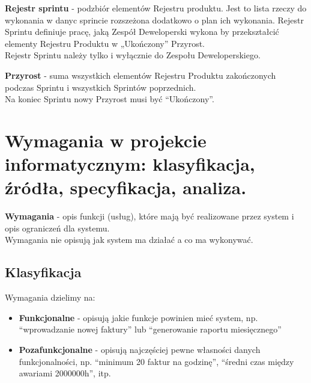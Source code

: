 \documentclass[12pt]{article}
\begin{document}
    \begin{definition}
        \textbf{Rejestr sprintu} - podzbiór elementów Rejestru produktu. Jest to lista rzeczy do wykonania w danyc sprincie rozszeżona dodatkowo o plan ich wykonania.
        Rejestr Sprintu definiuje pracę, jaką Zespół Deweloperski wykona by przekształcić elementy Rejestru Produktu w „Ukończony” Przyrost. \\
        Rejestr Sprintu należy tylko i wyłącznie do Zespołu Deweloperskiego.
    \end{definition}

    \begin{definition}
        \textbf{Przyrost} - suma wszystkich elementów Rejestru Produktu zakończonych podczas Sprintu i wszystkich Sprintów poprzednich. \\
        Na koniec Sprintu nowy Przyrost musi być ``Ukończony''.
    \end{definition}

    \newpage




    \section{Wymagania w projekcie informatycznym: klasyfikacja, źródła, specyfikacja, analiza.}

    \begin{definition}
        \textbf{Wymagania} - opis funkcji (usług), które mają być realizowane przez system i opis ograniczeń dla systemu. \\
        Wymagania nie opisują jak system ma działać a co ma wykonywać.
    \end{definition}

    \subsection{Klasyfikacja}

    \begin{definition}
        Wymagania dzielimy na:
        \begin{itemize}
            \item \textbf{Funkcjonalne} - opisują jakie funkcje powinien mieć system, np. ``wprowadzanie nowej faktury'' lub ``generowanie raportu miesięcznego''
            \item \textbf{Pozafunkcjonalne} - opisują najczęściej pewne własności danych funkcjonalności, np. ``minimum 20 faktur na godzinę'', ``średni czas między awariami 2000000h'', itp.
        \end{itemize}
    \end{definition}
\end{document}
